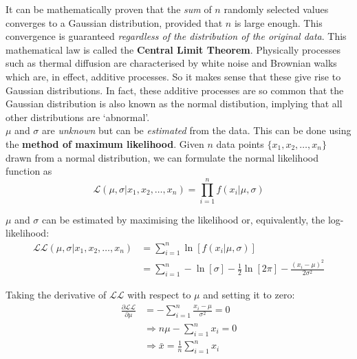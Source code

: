 \begin{refsection}
It can be mathematically proven that the \emph{sum} of $n$ randomly
selected values converges to a Gaussian distribution, provided that
$n$ is large enough. This convergence is guaranteed \textit{regardless
  of the distribution of the original data}.  This mathematical law is
called the \textbf{Central Limit Theorem}. Physically processes such
as thermal diffusion are characterised by white noise and Brownian
walks which are, in effect, additive processes.  So it makes sense
that these give rise to Gaussian distributions. In fact, these
additive processes are so common that the Gaussian distribution is
also known as the normal distibution, implying that all other
distributions are `abnormal'.\\

$\mu$ and $\sigma$ are \emph{unknown} but can be \emph{estimated} from
the data. This can be done using the \textbf{method of maximum
  likelihood}.  Given $n$ data points $\{x_1, x_2, \ldots, x_n\}$
drawn from a normal distribution, we can formulate the normal
likelihood function as
\begin{equation}
  \mathcal{L}(\mu,\sigma|x_1,x_2,\ldots,x_n) =
  \prod\limits_{i=1}^{n}f(x_i|\mu,\sigma)
  \label{eq:Lnorm}
\end{equation}

$\mu$ and $\sigma$ can be estimated by maximising the likelihood or,
equivalently, the log-likelihood:
\begin{equation}
  \begin{split}
    \mathcal{LL}(\mu,\sigma|x_1,x_2,\ldots,x_n) & =
    \sum\limits_{i=1}^{n}\ln\left[f(x_i|\mu,\sigma)\right] \\ & =
    \sum\limits_{i=1}^{n} -\ln[\sigma] - \frac{1}{2}\ln[2\pi] -
    \frac{(x_i-\mu)^2}{2\sigma^2}
  \end{split}
  \label{eq:LLnorm}
\end{equation}

Taking the derivative of $\mathcal{LL}$ with respect to $\mu$ and
setting it to zero:
\begin{equation}
  \begin{split}
    \frac{\partial{\mathcal{LL}}}{\partial{\mu}} & =
    - \sum\limits_{i=1}^{n} \frac{x_i-\mu}{\sigma^2} = 0 \\
    & \Rightarrow n\mu - \sum\limits_{i=1}^{n} x_i = 0 \\
    & \Rightarrow \bar{x} = \frac{1}{n}\sum\limits_{i=1}^{n}x_i
  \end{split}
  \label{eq:arithmeticmean}
\end{equation}


\end{refsection}
